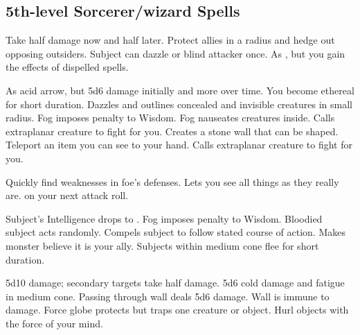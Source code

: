 \subsection{5th-level Sorcerer/wizard Spells} 
\begin{swspelllist}
   Take half damage now and half later. 
   Protect allies in a \areamed radius and hedge out opposing outsiders.
   Subject can dazzle or blind attacker once.
   As , but you gain the effects of dispelled spells.
  \spellheadrestricted{}

   As acid arrow, but 5d6 damage initially and more over time.
   You become ethereal for short duration.
   Dazzles and outlines concealed and invisible creatures in small radius.
   Fog imposes  penalty to Wisdom.
   Fog nauseates creatures inside.
   Calls extraplanar creature to fight for you.
   Creates a stone wall that can be shaped.
   Teleport an item you can see to your hand.
   Calls extraplanar creature to fight for you.

   Quickly find weaknesses in foe's defenses.
  \M Lets you see all things as they really are.
    on your next attack roll.

   Subject's Intelligence drops to .
   Fog imposes  penalty to Wisdom.
   Bloodied subject acts randomly.
   Compels subject to follow stated course of action.
   Makes monster believe it is your ally.
   Subjects within medium cone flee for short duration.

   5d10 damage; secondary targets take half damage.
   5d6 cold damage and fatigue in medium cone.
   Passing through wall deals 5d6 damage.
   Wall is immune to damage.
   Force globe protects but traps one creature or object.
   Hurl objects with the force of your mind.


\end{swspelllist}
